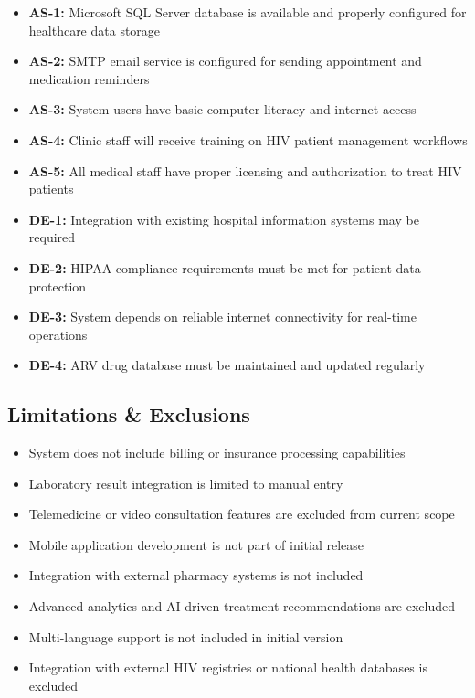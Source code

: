 \documentclass[12pt,a4paper]{article}
\begin{document}
\begin{itemize}
    \item \textbf{AS-1:} Microsoft SQL Server database is available and properly configured for healthcare data storage
    \item \textbf{AS-2:} SMTP email service is configured for sending appointment and medication reminders
    \item \textbf{AS-3:} System users have basic computer literacy and internet access
    \item \textbf{AS-4:} Clinic staff will receive training on HIV patient management workflows
    \item \textbf{AS-5:} All medical staff have proper licensing and authorization to treat HIV patients
    \item \textbf{DE-1:} Integration with existing hospital information systems may be required
    \item \textbf{DE-2:} HIPAA compliance requirements must be met for patient data protection
    \item \textbf{DE-3:} System depends on reliable internet connectivity for real-time operations
    \item \textbf{DE-4:} ARV drug database must be maintained and updated regularly
\end{itemize}

\subsection{Limitations \& Exclusions}

\begin{itemize}
    \item System does not include billing or insurance processing capabilities
    \item Laboratory result integration is limited to manual entry
    \item Telemedicine or video consultation features are excluded from current scope
    \item Mobile application development is not part of initial release
    \item Integration with external pharmacy systems is not included
    \item Advanced analytics and AI-driven treatment recommendations are excluded
    \item Multi-language support is not included in initial version
    \item Integration with external HIV registries or national health databases is excluded
\end{itemize}
\end{document}
